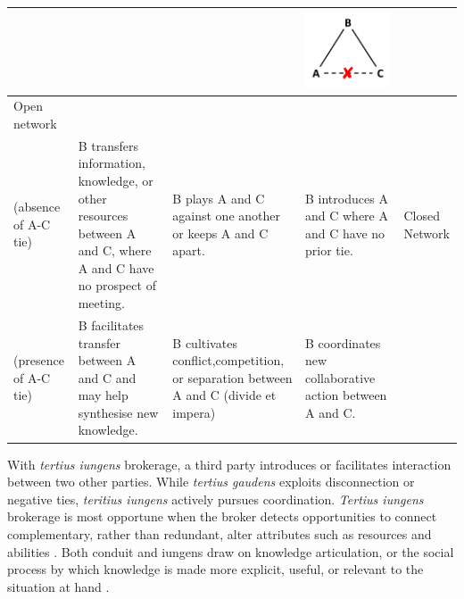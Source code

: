 \begin{table}[]
\begin{tabularx}{\textwidth}{>{\raggedright}p{3.5cm}>{\raggedright}p{3.5cm}>{\raggedright}p{3.5cm}>{\raggedright}p{3.5cm}}
	&  &  & \begin{minipage}{.2\textwidth} \centering \includegraphics[width=0.7\linewidth]{Images/TG_brokerage_2} \end{minipage}  &  \\
	\midrule
	Open network\\(absence of A-C tie) & B transfers information, knowledge, or other resources between A and C, where A and C have no prospect of meeting. & B plays A and C against one another or keeps A and C apart. & B introduces A and C where A and C have no prior tie. &
	\midrule
	Closed Network\\(presence of A-C tie) & B facilitates transfer between A and C and may help synthesise new knowledge. & B cultivates conflict,competition, or separation between A and C (divide et impera) & B coordinates new collaborative action between A and C. & \\ 
	\bottomrule
\end{tabularx}
\end{table}

With \emph{tertius iungens} brokerage, a third party introduces or facilitates interaction between two other parties. While \emph{tertius gaudens} exploits disconnection or negative ties, \emph{teritius iungens} actively pursues coordination. \emph{Tertius iungens} brokerage is most opportune when the broker detects opportunities to connect complementary, rather than redundant, alter attributes such as resources and abilities \citep{obstfeld2014brokerage}. Both conduit and iungens draw on knowledge articulation, or the social process by which knowledge is made more explicit, useful, or relevant to the situation at hand \citep{obstfeld2005social,obstfeld2011saying,obstfeld2012creative}.

